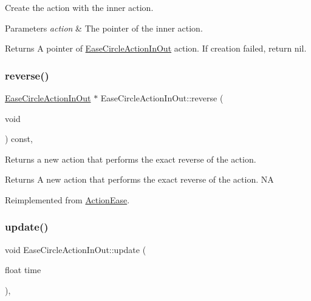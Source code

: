 Create the action with the inner action. 


\begin{DoxyParams}{Parameters}
{\em action} & The pointer of the inner action. \\
\hline
\end{DoxyParams}
\begin{DoxyReturn}{Returns}
A pointer of \hyperlink{classEaseCircleActionInOut}{Ease\+Circle\+Action\+In\+Out} action. If creation failed, return nil. 
\end{DoxyReturn}
\mbox{\label{classEaseCircleActionInOut_ab661d01e3d2ddf781948ae6c42a52cb9}} 
\subsubsection{\texorpdfstring{reverse()}{reverse()}}
{\footnotesize\ttfamily \hyperlink{classEaseCircleActionInOut}{Ease\+Circle\+Action\+In\+Out} $\ast$ Ease\+Circle\+Action\+In\+Out\+::reverse (\begin{DoxyParamCaption}\item[{void}]{ }\end{DoxyParamCaption}) const\hspace{0.3cm}{\ttfamily [override]}, {\ttfamily [virtual]}}

Returns a new action that performs the exact reverse of the action.

\begin{DoxyReturn}{Returns}
A new action that performs the exact reverse of the action.  NA 
\end{DoxyReturn}


Reimplemented from \hyperlink{classActionEase_ab99eb083fa033fae1d6c948fdc730782}{Action\+Ease}.

\mbox{\label{classEaseCircleActionInOut_a6a9cb49f30bc664ab65a067ce48b506e}} 
\subsubsection{\texorpdfstring{update()}{update()}}
{\footnotesize\ttfamily void Ease\+Circle\+Action\+In\+Out\+::update (\begin{DoxyParamCaption}\item[{float}]{time }\end{DoxyParamCaption})\hspace{0.3cm}{\ttfamily [override]}, {\ttfamily [virtual]}}

